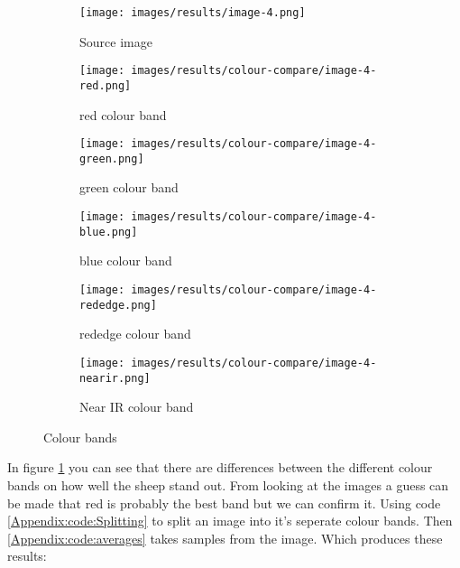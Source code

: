 \begin{figure}[H]
    \centering

\begin{subfigure}{.5\textwidth}
    \centering
    \texttt{[image: images/results/image-4.png]}
    \caption{Source image}

\end{subfigure}%
\begin{subfigure}{.5\textwidth}
\centering
    \texttt{[image: images/results/colour-compare/image-4-red.png]}
    \caption{red colour band}

\end{subfigure}
\begin{subfigure}{.5\textwidth}
\centering
    \texttt{[image: images/results/colour-compare/image-4-green.png]}
    \caption{green colour band}

\end{subfigure}%
\begin{subfigure}{.5\textwidth}
\centering
    \texttt{[image: images/results/colour-compare/image-4-blue.png]}
    \caption{blue colour band}

\end{subfigure}
\begin{subfigure}{.5\textwidth}
\centering
    \texttt{[image: images/results/colour-compare/image-4-rededge.png]}
    \caption{rededge colour band}

\end{subfigure}%
\begin{subfigure}{.5\textwidth}
\centering
    \texttt{[image: images/results/colour-compare/image-4-nearir.png]}
    \caption{Near IR colour band}

\end{subfigure}
    \caption{Colour bands}
    \label{fig:colour-bands}
\end{figure}

In figure \ref{fig:colour-bands} you can see that there are differences between the different colour bands on how well the sheep stand out. From looking at the images a guess can be made that red is probably the best band but we can confirm it. Using code \ref{Appendix:code:Splitting} to split an image into it's seperate colour bands. Then \ref{Appendix:code:averages} takes samples from the image. Which produces these results:

